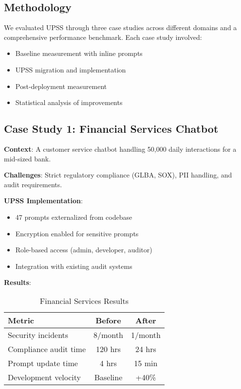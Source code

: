 \subsection{Methodology}

We evaluated UPSS through three case studies across different domains and a comprehensive performance benchmark. Each case study involved:

\begin{itemize}
    \item Baseline measurement with inline prompts
    \item UPSS migration and implementation
    \item Post-deployment measurement
    \item Statistical analysis of improvements
\end{itemize}

\subsection{Case Study 1: Financial Services Chatbot}

\textbf{Context}: A customer service chatbot handling 50,000 daily interactions for a mid-sized bank.

\textbf{Challenges}: Strict regulatory compliance (GLBA, SOX), PII handling, and audit requirements.

\textbf{UPSS Implementation}:
\begin{itemize}
    \item 47 prompts externalized from codebase
    \item Encryption enabled for sensitive prompts
    \item Role-based access (admin, developer, auditor)
    \item Integration with existing audit systems
\end{itemize}

\textbf{Results}:
\begin{table}[h]
\centering
\caption{Financial Services Results}
\begin{tabular}{@{}lcc@{}}
\toprule
\textbf{Metric} & \textbf{Before} & \textbf{After} \\ \midrule
Security incidents & 8/month & 1/month \\
Compliance audit time & 120 hrs & 24 hrs \\
Prompt update time & 4 hrs & 15 min \\
Development velocity & Baseline & +40\% \\
\bottomrule
\end{tabular}
\end{table}

